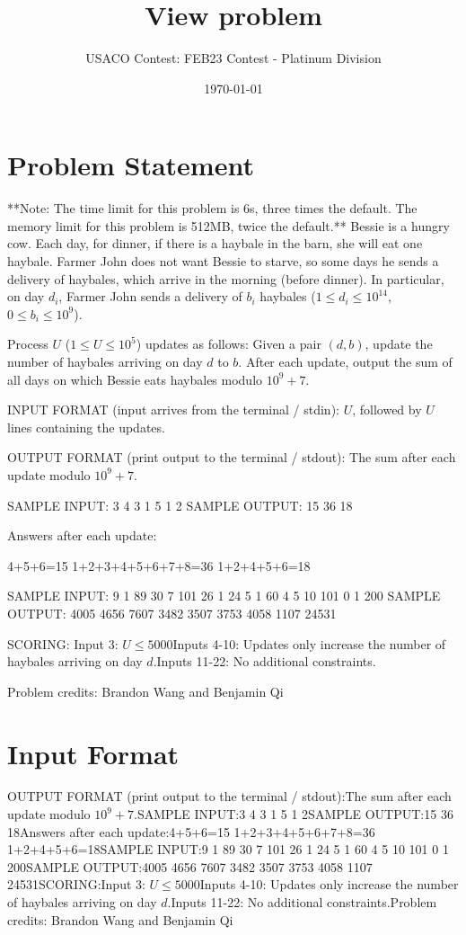 \documentclass[12pt]{article}
\title{View problem}
\author{USACO Contest: FEB23 Contest - Platinum Division}
\date{\today}
\begin{document}
\maketitle

\section*{Problem Statement}


**Note: The time limit for this problem is 6s, three times the default. The
memory limit for this problem is 512MB, twice the default.**
Bessie is a hungry cow. Each day, for dinner, if there is a haybale in the barn,
she will eat one haybale. Farmer John does not want Bessie to starve, so some
days he sends a delivery of haybales, which arrive in the morning (before
dinner). In particular, on day $d_i$, Farmer John sends a delivery of $b_i$
haybales ($1\leq d_i \leq 10^{14}$, $0\leq b_i \leq 10^9$).

Process $U$ ($1\le U\le 10^5$) updates as follows: Given a pair  $(d, b)$, 
update the number of haybales arriving on day $d$ to $b$.  After each update,
output the sum of all days on which Bessie eats haybales modulo
$10^9+7$.

INPUT FORMAT (input arrives from the terminal / stdin):
$U$, followed by $U$ lines containing the updates.

OUTPUT FORMAT (print output to the terminal / stdout):
The sum after each update modulo $10^9+7$.

SAMPLE INPUT:
3
4 3
1 5
1 2
SAMPLE OUTPUT: 
15
36
18

Answers after each update:


4+5+6=15
1+2+3+4+5+6+7+8=36
1+2+4+5+6=18

SAMPLE INPUT:
9
1 89
30 7
101 26
1 24
5 1
60 4
5 10
101 0
1 200
SAMPLE OUTPUT: 
4005
4656
7607
3482
3507
3753
4058
1107
24531

SCORING:
Input 3: $U\le 5000$Inputs 4-10: Updates only increase the number of haybales arriving on day
$d$.Inputs 11-22: No additional constraints.


Problem credits: Brandon Wang and Benjamin Qi



\section*{Input Format}
OUTPUT FORMAT (print output to the terminal / stdout):The sum after each update modulo $10^9+7$.SAMPLE INPUT:3
4 3
1 5
1 2SAMPLE OUTPUT:15
36
18Answers after each update:4+5+6=15
1+2+3+4+5+6+7+8=36
1+2+4+5+6=18SAMPLE INPUT:9
1 89
30 7
101 26
1 24
5 1
60 4
5 10
101 0
1 200SAMPLE OUTPUT:4005
4656
7607
3482
3507
3753
4058
1107
24531SCORING:Input 3: $U\le 5000$Inputs 4-10: Updates only increase the number of haybales arriving on day
$d$.Inputs 11-22: No additional constraints.Problem credits: Brandon Wang and Benjamin Qi
\end{document}
